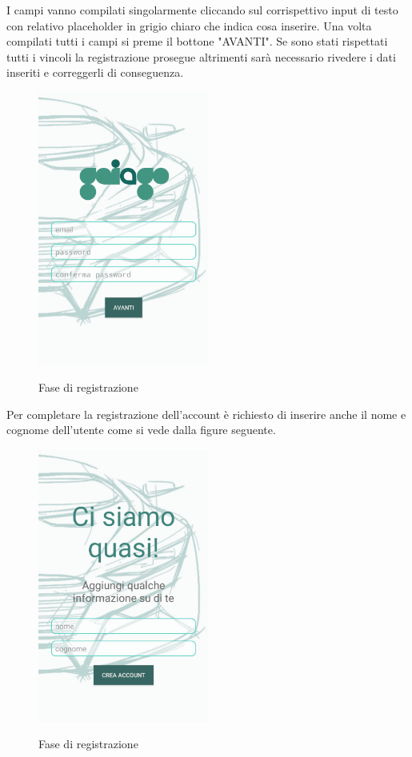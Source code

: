 I campi vanno compilati singolarmente cliccando sul corrispettivo input di testo con relativo placeholder in grigio chiaro che indica cosa inserire. Una volta compilati tutti i campi si preme il bottone "AVANTI". Se sono stati rispettati tutti i vincoli la registrazione prosegue altrimenti sarà necessario rivedere i dati inseriti e correggerli di conseguenza. 
 \begin{figure}[H] 
 	\centering 
 	\includegraphics[width=0.5\textwidth]{res/images/registrazione.png}\\
 	\caption{Fase di registrazione}
 	\label{registrazione}
 \end{figure}

\pagebreak

Per completare la registrazione dell'account è richiesto di inserire anche il nome e cognome dell'utente come si vede dalla figure seguente.
 \begin{figure}[H] 
	\centering 
	\includegraphics[width=0.5\textwidth]{res/images/registrazione2.png}\\
	\caption{Fase di registrazione}
	\label{registrazione2}
\end{figure}

